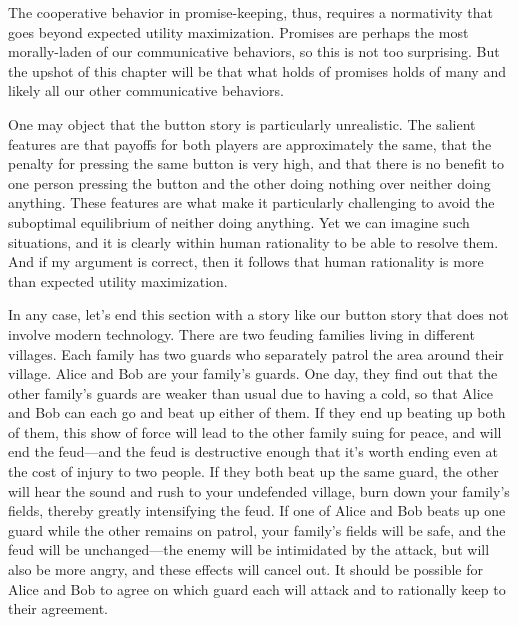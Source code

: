 The cooperative behavior in promise-keeping, thus, requires a normativity that goes beyond expected utility
maximization. Promises are perhaps the most morally-laden of our communicative behaviors, so this is not too
surprising. But the upshot of this chapter will be that what holds of promises holds of many and likely all
our other communicative behaviors. 

One may object that the button story is particularly unrealistic. The salient features are that payoffs for
both players are approximately the same, that the penalty for pressing the same button is very high, and 
that there is no benefit to one person pressing the button and the other doing nothing over neither doing
anything. These features are what make it particularly challenging to avoid the suboptimal equilibrium of
neither doing anything. Yet we can imagine such situations, and it is clearly within human rationality
to be able to resolve them. And if my argument is correct, then it follows that human rationality is more
than expected utility maximization. 

In any case, let's end this section with a story like our button story that does not involve modern technology. There are
two feuding families living in different villages. Each family has two guards who separately patrol the
area around their village. Alice and Bob are your family's guards. One day, they find out that the other
family's guards are weaker than usual due to having a cold, so that Alice and Bob can each go and beat up 
either of them. If they end up beating up both of them, this show of force will lead to the other family
suing for peace, and will end the feud---and the feud is destructive enough that it's worth ending even at
the cost of injury to two people. If they both beat up the same guard, the other will hear the sound and 
rush to your undefended village, burn down your family's fields, thereby greatly intensifying the feud. 
If one of Alice and Bob beats up one guard while the other remains on patrol, your family's fields will be 
safe, and the feud will be unchanged---the enemy will be intimidated by the attack, but will also 
be more angry, and these effects will cancel out. It should be possible for Alice and Bob to agree on which
guard each will attack and to rationally keep to their agreement.

